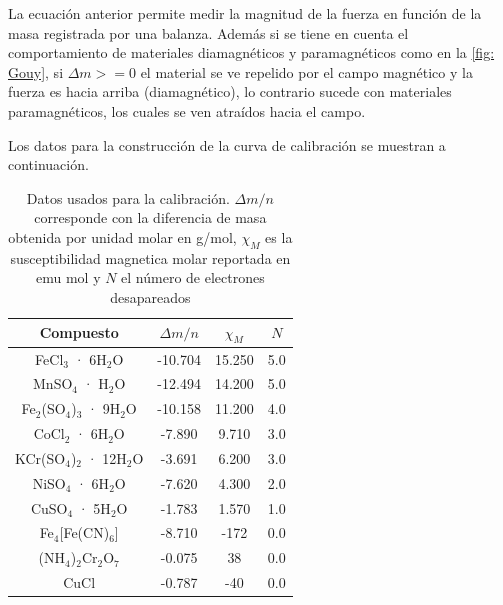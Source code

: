 \documentclass[fleqn,10pt]{SelfArx} %
\begin{document}
	La ecuaci\'on anterior permite medir la magnitud de la fuerza en funci\'on de la masa registrada por una balanza. Adem\'as si se tiene en cuenta el comportamiento de materiales diamagn\'eticos y paramagn\'eticos como en la \autoref{fig: Gouy}, si $\Delta m>=0$ el material se ve repelido por el campo magn\'etico y la fuerza es hacia arriba (diamagn\'etico), lo contrario sucede con materiales paramagn\'eticos, los cuales se ven atra\'idos hacia el campo. 
	
	Los datos para la construcci\'on de la curva de calibraci\'on se muestran a continuaci\'on.
	\begin{table}[h]
	    \centering
	    \caption{Datos usados para la calibraci\'on. $\Delta m/n$ corresponde con la diferencia de masa obtenida por unidad molar en g/mol, $\chi_M$ es la susceptibilidad magnetica molar reportada en emu mol y $N$ el n\'umero de electrones desapareados}
	    \small
	    \begin{tabular}{c|ccc}
	        \hline
	        \textbf{Compuesto} & $\Delta m/n$ & $\chi_M$ & $N$ \\
	        \hline
	        FeCl$_3$ · 6H$_2$O & -10.704 & 15.250 & 5.0 \\
            MnSO$_4$ · H$_2$O & -12.494 & 14.200 & 5.0 \\
            Fe$_2$(SO$_4$)$_3$ · 9H$_2$O & -10.158 & 11.200 & 4.0 \\
            CoCl$_2$ · 6H$_2$O & -7.890 & 9.710 & 3.0 \\
            KCr(SO$_4$)$_2$ · 12H$_2$O & -3.691 & 6.200 & 3.0 \\
            NiSO$_4$ · 6H$_2$O & -7.620 & 4.300 & 2.0 \\
            CuSO$_4$ · 5H$_2$O & -1.783 & 1.570 & 1.0 \\
            Fe$_4$[Fe(CN)$_6$] & -8.710 & -172 & 0.0 \\
            (NH$_4$)$_2$Cr$_2$O$_7$ & -0.075 & 38 & 0.0 \\
            CuCl & -0.787 & -40 & 0.0 \\
            \hline
	    \end{tabular}
	    \normalsize
	    \label{tab: calibrationData}
	\end{table}
	
\end{document}
